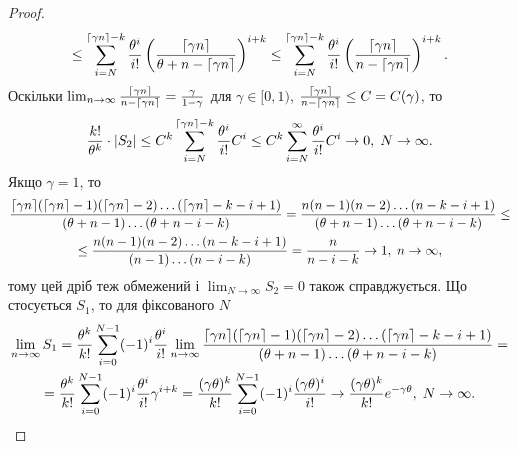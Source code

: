 \begin{proof}
\begin{gather*}
        \leq 
        \sum_{i=N}^{\ceil*{\gamma n}-k}
        \frac{\theta^i}{i!}
        \left(\frac{
            \ceil*{\g n}
        }{
            \theta + n - \ceil*{\g n}
        }\right)^{i+k} \leq 
        \sum_{i=N}^{\ceil*{\gamma n}-k}
        \frac{\theta^i}{i!}
        \left(\frac{
            \ceil*{\g n}
        }{
            n - \ceil*{\g n}
        }\right)^{i+k}.
    \end{gather*}
    Оскільки $\lim_{n\to\infty} \frac{
        \ceil*{\g n}
    }{
        n - \ceil*{\g n}
    } = \frac{\gamma}{1-\gamma}$ для $\gamma \in [0, 1)$,
    $\frac{
        \ceil*{\g n}
    }{
        n - \ceil*{\g n}
    } \leq C = C(\gamma)$, то
    \begin{gather*}
        \frac{k!}{\theta^k} \cdot |S_2| \leq C^k
        \sum_{i=N}^{\ceil*{\gamma n}-k}
        \frac{\theta^i}{i!} C^i \leq
        C^k
        \sum_{i=N}^{\infty}
        \frac{\theta^i}{i!} C^i \to 0, \; N \to \infty.
    \end{gather*}
    Якщо $\gamma = 1$, то
    \begin{gather*}
        \frac{
            \ceil*{\g n} (\ceil*{\g n} - 1) (\ceil*{\g n} - 2) \dots (\ceil*{\g n} - k - i + 1)
        }{
            (\theta + n - 1) \dots (\theta + n - i - k)
        } = 
        \frac{
            n (n - 1) (n - 2) \dots (n - k - i + 1)
        }{
            (\theta + n - 1) \dots (\theta + n - i - k)
        } \leq \\ \leq
        \frac{
            n (n - 1) (n - 2) \dots (n - k - i + 1)
        }{
            (n - 1) \dots (n - i - k)
        } = \frac{n}{n - i - k} \to 1, \; n\to\infty,
    \end{gather*}
    тому цей дріб теж обмежений і
    $\lim_{N\to\infty} S_2 = 0$ також справджується.
    Що стосується $S_1$, то для фіксованого $N$
    \begin{gather*}
        \lim_{n\to\infty} S_1 = \frac{\theta^k}{k!} \sum_{i=0}^{N-1} (-1)^i
        \frac{\theta^i}{i!} \lim_{n\to\infty} 
        \frac{
            \ceil*{\g n} (\ceil*{\g n} - 1) (\ceil*{\g n} - 2) \dots (\ceil*{\g n} - k - i + 1)
        }{
            (\theta + n - 1) \dots (\theta + n - i - k)
        } = \\ =
        \frac{\theta^k}{k!} \sum_{i=0}^{N-1} (-1)^i
        \frac{\theta^i}{i!} \gamma^{i+k} = 
        \frac{(\gamma\theta)^k}{k!} \sum_{i=0}^{N-1} (-1)^i
        \frac{(\gamma\theta)^i}{i!} \to \frac{(\gamma\theta)^k}{k!}e^{-\gamma\theta}, \; N\to\infty.
    \end{gather*}
\end{proof}

